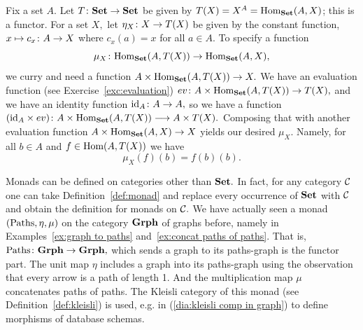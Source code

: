 \documentclass[CT4S-EN-RU]{subfiles}
\begin{document}
\begin{exerciseRUS}\label{exc:exceptions}
\end{exerciseRUS}

\begin{exampleENG}\label{ex:experimenter matters 2}
Fix a set $A.$ Let $T\colon{\mathbf{Set}}\rightarrow{\mathbf{Set}}$ be given by $T(X)=X^A=\textnormal{Hom}_{\mathbf{Set}}(A,X)$; this is a functor. For a set $X,$ let $\eta_X\colon X\rightarrow T(X)$ be given by the constant function, $x\mapsto c_x\colon A\rightarrow X$ where $c_x(a)=x$ for all $a\in A.$ To specify a function
$$\mu_X\colon\textnormal{Hom}_{\mathbf{Set}}(A,T(X))\rightarrow\textnormal{Hom}_{\mathbf{Set}}(A,X),$$ we curry and need a function $A\times\textnormal{Hom}_{\mathbf{Set}}(A,T(X))\rightarrow X.$ We have an evaluation function (see Exercise~\ref{exc:evaluation}) $ev\colon A\times\textnormal{Hom}_{\mathbf{Set}}(A,T(X))\rightarrow T(X),$ and we have an identity function $\textnormal{id}_A\colon A\rightarrow A,$ so we have a function $(\textnormal{id}_A\times ev)\colon A\times\textnormal{Hom}_{\mathbf{Set}}(A,T(X))\longrightarrow A\times T(X).$ Composing that with another evaluation function $A\times\textnormal{Hom}_{\mathbf{Set}}(A,X)\rightarrow X$ yields our desired $\mu_X.$ Namely, for all $b\in A$ and $f\in\textnormal{Hom}(A,T(X))$ we have
$$\mu_X(f)(b)=f(b)(b).$$
\end{exampleENG}

\begin{exampleRUS}\label{ex:experimenter matters 2}
\end{exampleRUS}

\begin{remarkENG}
Monads can be defined on categories other than ${\mathbf{Set}}.$ In fact, for any category $\mathcal{C}$ one can take Definition~\ref{def:monad} and replace every occurrence of ${\mathbf{Set}}$ with $\mathcal{C}$ and obtain the definition for monads on $\mathcal{C}.$ We have actually seen a monad $(\textnormal{Paths},\eta,\mu)$ on the category ${\mathbf{Grph}}$ of graphs before, namely in Examples~\ref{ex:graph to paths} and~\ref{ex:concat paths of paths}. That is, $\textnormal{Paths}\colon{\mathbf{Grph}}\rightarrow{\mathbf{Grph}},$ which sends a graph to its paths-graph is the functor part. The unit map $\eta$ includes a graph into its paths-graph using the observation that every arrow is a path of length 1. And the multiplication map $\mu$ concatenates paths of paths. The Kleisli category of this monad (see Definition~\ref{def:kleisli}) is used, e.g. in (\ref{dia:kleisli comp in graph}) to define morphisms of database schemas.
\end{remarkENG}

\begin{remarkRUS}
\end{remarkRUS}
\end{document}
